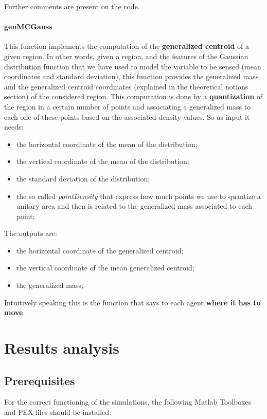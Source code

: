\documentclass[a4paper,11pt,oneside]{book}
\begin{document}
Further comments are present on the code.\\

\newpage 
\subsubsection{genMCGauss}
	
	This function implements the computation of the \textbf{generalized centroid} of a given region. In other words, given a region, and the features of the Gaussian distribution function that we have used to model the variable to be sensed (mean coordinates and standard deviation), this function provides the generalized mass and the generalized centroid coordinates (explained in the theoretical notions section) of the considered region. This computation is done by a \textbf{quantization} of the region in a certain number of points and associating a generalized mass to each one of these points based on the associated density values. So as input it needs: 
	 \begin{itemize}
	\item the horizontal coordinate of the mean of the distribution;
	\item the vertical coordinate of the mean of the distribution;
	\item the standard deviation of the distribution;
	\item the so called \emph{pointDensity} that express how much points we use to quantize a unitary area and then is related to the generalized mass associated to each point;
\end{itemize}
	The outputs are:
	 \begin{itemize}
	\item the horizontal coordinate of the generalized centroid;
	\item the vertical coordinate of the mean generalized centroid; 
	\item the generalized mass;
\end{itemize}
	Intuitively speaking this is the function that says to each agent \textbf{where it has to move}.
	
	\chapter{Results analysis}
	
	\section{Prerequisites}
	For the correct functioning of the simulations, the following Matlab Toolboxes and FEX files should be installed:
	
\end{document}
